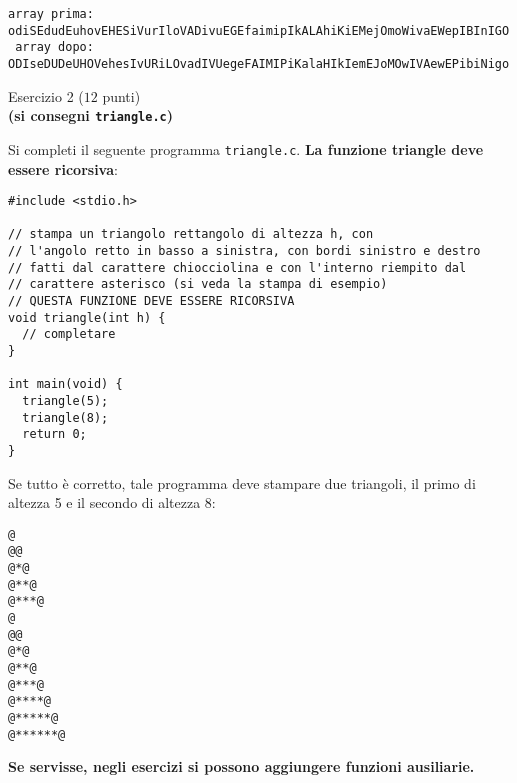 \documentclass[12pt]{article}
\begin{document}
\begin{mdframed}[backgroundcolor=lightgrey] 
\begin{verbatim}
array prima: odiSEdudEuhovEHESiVurIloVADivuEGEfaimipIkALAhiKiEMejOmoWivaEWepIBInIGO
 array dopo: ODIseDUDeUHOVehesIvURiLOvadIVUegeFAIMIPiKalaHIkIemEJoMOwIVAewEPibiNigo
\end{verbatim}
\end{mdframed}

\begin{center}
  {\Large Esercizio 2} ($12$ punti)\\
  \textbf{(si consegni \texttt{triangle.c})}
\end{center}
%
Si completi il seguente programma \texttt{triangle.c}.
\textbf{La funzione triangle deve essere ricorsiva}:

\begin{center}
  \begin{lstlisting}[language=myC]
#include <stdio.h>

// stampa un triangolo rettangolo di altezza h, con
// l'angolo retto in basso a sinistra, con bordi sinistro e destro
// fatti dal carattere chiocciolina e con l'interno riempito dal
// carattere asterisco (si veda la stampa di esempio)
// QUESTA FUNZIONE DEVE ESSERE RICORSIVA
void triangle(int h) {
  // completare
}

int main(void) {
  triangle(5);
  triangle(8);
  return 0;
}
  \end{lstlisting}
\end{center}

Se tutto \`e corretto, tale programma deve stampare due triangoli, il
primo di altezza 5 e il secondo di altezza 8:

\begin{mdframed}[backgroundcolor=lightgrey] 
\begin{verbatim}
@
@@
@*@
@**@
@***@
@
@@
@*@
@**@
@***@
@****@
@*****@
@******@
\end{verbatim}
\end{mdframed}

\begin{mdframed}[backgroundcolor=lightred] 
  \textbf{Se servisse, negli esercizi si possono aggiungere funzioni ausiliarie.}
\end{mdframed}
\end{document}
